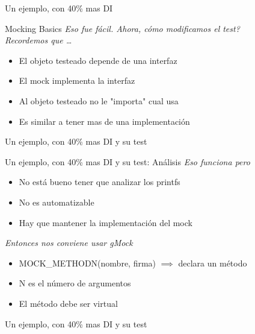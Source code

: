 \begin{frame}[shrink=2,plain]{Un ejemplo, con 40\% mas DI}

\end{frame}


\begin{frame}{Mocking Basics}
\textit{Eso fue f\'acil. Ahora, \textquestiondown c\'omo modificamos el test? \\
Recordemos que \ldots}
\begin{itemize}
	\item El objeto testeado depende de una interfaz
	\item El mock implementa la interfaz
	\item Al objeto testeado no le "importa" cual usa
	\item Es similar a tener mas de una implementaci\'on
\end{itemize}
\begin{center}
\end{center}
\end{frame}


\begin{frame}[shrink=2]{Un ejemplo, con 40\% mas DI y su test}

\end{frame}


\begin{frame}[shrink=2]{Un ejemplo, con 40\% mas DI y su test: An\'alisis}
\textit{ Eso funciona pero }
\begin{itemize}
	\item No est\'a bueno tener que analizar los printfs
	\item No es automatizable
	\item Hay que mantener la implementaci\'on del mock
\end{itemize}
\bigskip
\textit{ Entonces nos conviene usar gMock }
\begin{itemize}
	\item MOCK\_METHOD\alert{N}(nombre, firma) $\implies$ declara un m\'etodo
	\item \alert{N} es el n\'umero de argumentos
	\item El m\'etodo debe ser virtual
\end{itemize}
\end{frame}


\begin{frame}[shrink=2]{Un ejemplo, con 40\% mas DI y su test}

\end{frame}




